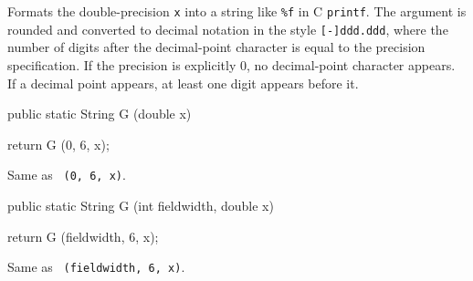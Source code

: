 \begin{tabb} Formats the double-precision \texttt{x} into a string like
\texttt{\%f} in  C \texttt{printf}.
The argument is  rounded  and  converted to
decimal notation in the style \texttt{[-]ddd.ddd}, where the
number of digits after the decimal-point character
is  equal  to  the precision specification.
If the precision is explicitly 0, no decimal-point
character appears.  If a decimal point appears, at least
one digit appears before it.
%
\end{tabb}
\begin{htmlonly}
\end{htmlonly}
\begin{code}

   public static String G (double x)\begin{hide} {
        return G (0, 6, x);
   }\end{hide}
\end{code}
\begin{tabb}   Same as ~\texttt{(0, 6, x)}.
\end{tabb}
\begin{htmlonly}
\end{htmlonly}
\begin{code}

   public static String G (int fieldwidth, double x)\begin{hide} {
        return G (fieldwidth, 6, x);
   }\end{hide}
\end{code}
\begin{tabb}   Same as ~\texttt{(fieldwidth, 6, x)}.
\end{tabb}
\begin{htmlonly}
\end{htmlonly}
